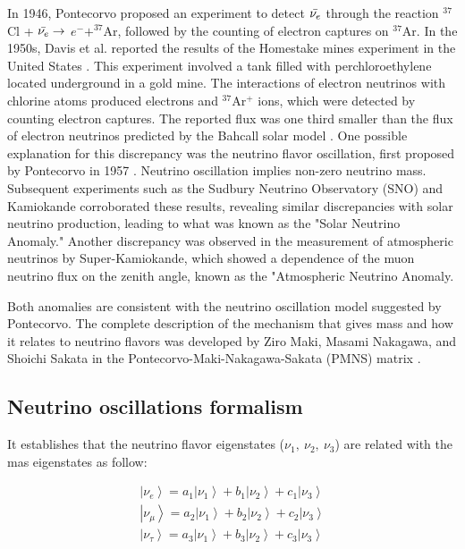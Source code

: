 In 1946, Pontecorvo proposed an experiment to detect $\Bar{\nu_e}$  through the reaction $^{37}$Cl + $\Bar{\nu_e} \rightarrow$ $e^- + ^{37}$Ar, followed by the counting of electron captures on $^{37}$Ar. In the 1950s, Davis et al. reported the results of the Homestake mines experiment in the United States \cite{PhysRev.86.976, PhysRev.97.766}. This experiment involved a tank filled with perchloroethylene located underground in a gold mine. The interactions of electron neutrinos with chlorine atoms produced electrons and $^{37}$Ar$^+$ ions, which were detected by counting electron captures. The reported flux was one third smaller than the flux of electron neutrinos predicted by the Bahcall solar model \cite{SolarModel}. One possible explanation for this discrepancy was the neutrino flavor oscillation, first proposed by Pontecorvo in 1957 \cite{Pontecorvo:1957cp}. Neutrino oscillation implies non-zero neutrino mass. Subsequent experiments such as the Sudbury Neutrino Observatory (SNO) and Kamiokande corroborated these results, revealing similar discrepancies with solar neutrino production, leading to what was known as the "Solar Neutrino Anomaly." Another discrepancy was observed in the measurement of atmospheric neutrinos by Super-Kamiokande, which showed a dependence of the muon neutrino flux on the zenith angle, known as the "Atmospheric Neutrino Anomaly.

Both anomalies are consistent with the neutrino oscillation model suggested by Pontecorvo. The complete description of the mechanism that gives mass and how it relates to neutrino flavors was developed by Ziro Maki, Masami Nakagawa, and Shoichi Sakata in the Pontecorvo-Maki-Nakagawa-Sakata (PMNS) matrix \cite{10.1143/PTP.28.870}. 

\subsection{Neutrino oscillations formalism}
It establishes that the neutrino flavor eigenstates ($\nu_1,\ \nu_2,\ \nu_3$) are related with the mas eigenstates as follow:

\begin{equation}
    \begin{split}
        \left|\nu_e\right> = a_1\left|\nu_1\right> + b_1\left|\nu_2\right> + c_1\left|\nu_3\right>\\
        \left|\nu_\mu\right> = a_2\left|\nu_1\right> + b_2\left|\nu_2\right> + c_2\left|\nu_3\right>\\
        \left|\nu_\tau\right> = a_3\left|\nu_1\right> + b_3\left|\nu_2\right> + c_3\left|\nu_3\right>
    \end{split}   
    \label{eq:MassEigenstatesSum}
\end{equation}

